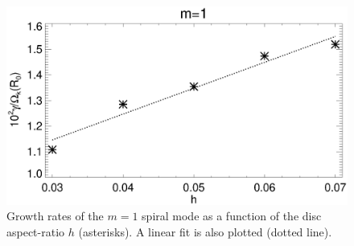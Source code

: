 \begin{figure}
  \includegraphics[width=\linewidth]{figures/m1_analysis_plot_ratemax_fargo_varh.ps}    
  \caption{Growth rates of the $m=1$ spiral mode as a function of the
    disc aspect-ratio $h$ (asterisks). A linear fit is also
    plotted (dotted line). 
    \label{fargo_varh_growth}} 
\end{figure}
